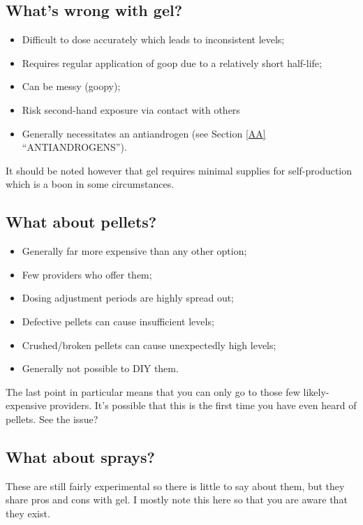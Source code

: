 \documentclass{article}
\begin{document}
\subsection{What’s wrong with gel?}

\begin{itemize}
  \item Difficult to dose accurately which leads to inconsistent levels;
  \item Requires regular application of goop due to a relatively short half-life;
  \item Can be messy (goopy);
  \item Risk second-hand exposure via contact with others
  \item Generally necessitates an antiandrogen (see Section \ref{AA} “ANTIANDROGENS”).
\end{itemize}

It should be noted however that gel requires minimal supplies for self-production which is a boon in some circumstances.

\subsection{What about pellets?}

\begin{itemize}
  \item Generally far more expensive than any other option;
  \item Few providers who offer them;
  \item Dosing adjustment periods are highly spread out;
  \item Defective pellets can cause insufficient levels;
  \item Crushed/broken pellets can cause unexpectedly high levels;
  \item Generally not possible to DIY them.
\end{itemize}

The last point in particular means that you can only go to those few likely-expensive providers. It’s possible that this is the first time you have even heard of pellets. See the issue?

\subsection{What about sprays?}

These are still fairly experimental so there is little to say about them, but they share pros and cons with gel. I mostly note this here so that you are aware that they exist.
\end{document}
